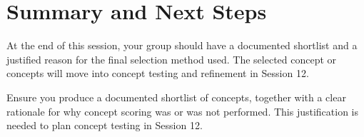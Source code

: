 \section{Summary and Next Steps}

At the end of this session, your group should have a documented shortlist and a justified reason for the final selection method used. The selected concept or concepts will move into concept testing and refinement in Session 12.

\begin{tcolorbox}[title=Checkpoint]
Ensure you produce a documented shortlist of concepts, together with a clear rationale for why concept scoring was or was not performed. This justification is needed to plan concept testing in Session 12.
\end{tcolorbox}

